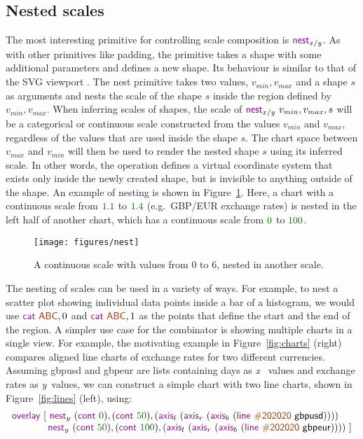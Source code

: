 \documentclass{jfp}
\newcommand{\X}{\emph{x}\ }
\newcommand{\Y}{\emph{y}\ }
\newcommand{\num}[1]{\textcolor{numclr}{#1}}
\newcommand{\strf}[1]{\textnormal{\textcolor{strclr}{\sffamily #1}}}
\newcommand{\ident}[1]{\textnormal{\textcolor{idclr}{\sffamily #1}}}
\newcommand{\kvd}[1]{\textnormal{\textcolor{kvdclr}{\sffamily #1}}}
\begin{document}
\subsection{Nested scales}

The most interesting primitive for controlling scale composition
is $\kvd{nest}_{x/y}$. As with other primitives like \kvd{padding}, the primitive takes a shape
with some additional parameters and defines a new shape.
Its behaviour is similar to that of the SVG viewport \cite{svg}.
The \kvd{nest} primitive takes two values, $v_{min}, v_{max}$ and a shape $s$ as arguments and
nests the scale of the shape $s$ inside the region defined by $v_{min}, v_{max}$.
When inferring scales of shapes, the scale of $\kvd{nest}_{x/y}~v_{min}, v_{max}, s$ will be a
categorical or continuous scale constructed from the values $v_{min}$ and $v_{max}$, regardless
of the values that are used inside the shape $s$. The chart space between $v_{max}$ and $v_{min}$
will then be used to render the nested shape $s$ using its inferred scale. In other words, the
operation defines a virtual coordinate system that exists only inside the newly created shape,
but is invisible to anything outside of the shape.
An example of nesting is shown in Figure~\ref{fig:nesting}.
Here, a chart with a continuous scale from $\num{1.1}$ to $\num{1.4}$ (e.g.~GBP/EUR exchange rates)
is nested in the left half of another chart, which has a continuous scale from $\num{0}$ to $\num{100}$.

\begin{figure}
\texttt{[image: figures/nest]}
\caption{A continuous scale with values from $0$ to $6$, nested in another scale.}
\label{fig:nesting}
\end{figure}

The nesting of scales can be used in a variety of ways. For example, to nest a scatter plot
showing individual data points inside a bar of a histogram, we would use $\kvd{cat}~\strf{ABC}, 0$
and $\kvd{cat}~\strf{ABC}, 1$ as the points that define the start and the end of the region. A simpler
use case for the combinator is showing multiple charts in a single view. For example, the motivating example
in Figure~\ref{fig:charts} (right) compares aligned line charts of exchange rates for two
different currencies. Assuming \ident{gbpusd} and \ident{gbpeur} are lists containing days as \X
values and exchange rates as \Y values, we can construct a simple chart with two line charts,
shown in Figure~\ref{fig:lines} (left), using:
%
\begin{equation*}
\begin{array}{l}
\kvd{overlay}~[~
\kvd{nest}_y~(\kvd{cont}~\num{0}),(\kvd{cont}~\num{50}), (\kvd{axis}_l~(\kvd{axis}_r~(\kvd{axis}_b~(\kvd{line}~\strf{\#202020}~\ident{gbpusd}))))\\
\hspace{3.68em} \kvd{nest}_y~(\kvd{cont}~\num{50}),(\kvd{cont}~\num{100}), (\kvd{axis}_l~(\kvd{axis}_r~(\kvd{axis}_b~(\kvd{line}~\strf{\#202020}~\ident{gbpeur}))))~]\\
\end{array}
\end{equation*}
\end{document}
